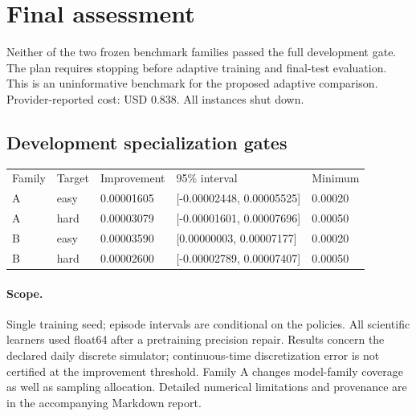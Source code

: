 \documentclass{article}
\begin{document}
\section*{Final assessment}
Neither of the two frozen benchmark families passed the full development gate. The plan requires stopping before adaptive training and final-test evaluation. This is an uninformative benchmark for the proposed adaptive comparison.
Provider-reported cost: USD 0.838. All instances shut down.
\subsection*{Development specialization gates}
\begin{tabular}{lllll}
Family & Target & Improvement & 95\% interval & Minimum \\
A & easy & 0.00001605 & [-0.00002448, 0.00005525] & 0.00020 \\
A & hard & 0.00003079 & [-0.00001601, 0.00007696] & 0.00050 \\
B & easy & 0.00003590 & [0.00000003, 0.00007177] & 0.00020 \\
B & hard & 0.00002600 & [-0.00002789, 0.00007407] & 0.00050 \\
\end{tabular}
\paragraph{Scope.} Single training seed; episode intervals are conditional on the policies. All scientific learners used float64 after a pretraining precision repair. Results concern the declared daily discrete simulator; continuous-time discretization error is not certified at the improvement threshold. Family A changes model-family coverage as well as sampling allocation. Detailed numerical limitations and provenance are in the accompanying Markdown report.
\end{document}
